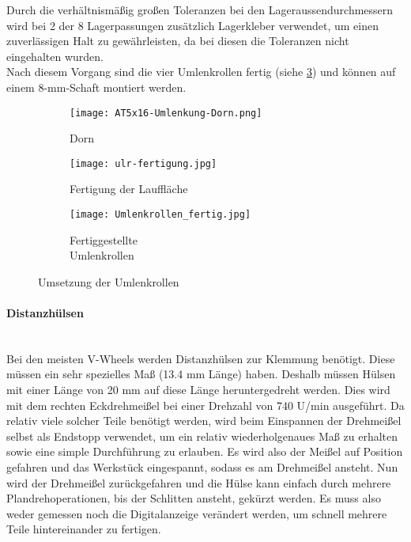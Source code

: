     Durch die verhältnismäßig großen Toleranzen bei den Lageraussendurchmessern wird bei 2 der 8 Lagerpassungen zusätzlich Lagerkleber verwendet, um einen zuverlässigen Halt zu gewährleisten, da bei diesen die Toleranzen nicht eingehalten wurden.\\
    Nach diesem Vorgang sind die vier Umlenkrollen fertig (siehe \ref{ulr:f2}) und können auf einem 8-mm-Schaft montiert werden.

    \begin{figure}[H]
        \centering
        \begin{subfigure}{.3\textwidth}
            \centering
            \texttt{[image: AT5x16-Umlenkung-Dorn.png]}
            \caption{Dorn}
            \label{ulr:dorn}
        \end{subfigure}%
        \begin{subfigure}{.3\textwidth}
            \centering
            \texttt{[image: ulr-fertigung.jpg]}
            \caption{Fertigung der Lauffläche}
            \label{ulr:f1}
        \end{subfigure}%
        \begin{subfigure}{.3\textwidth}
            \centering
            \texttt{[image: Umlenkrollen\_fertig.jpg]}
            \centering
            \caption{Fertiggestellte \\Umlenkrollen}
            \label{ulr:f2}
        \end{subfigure}
        \caption{Umsetzung der Umlenkrollen}
        \label{ulr}
    \end{figure}

\paragraph{Distanzhülsen}\mbox{}\\
Bei den meisten V-Wheels werden Distanzhülsen zur Klemmung benötigt. Diese müssen ein sehr spezielles Maß (13.4 mm Länge) haben. Deshalb müssen Hülsen mit einer Länge von 20 mm auf diese Länge heruntergedreht werden. Dies wird mit dem rechten Eckdrehmeißel bei einer Drehzahl von 740 U/min ausgeführt. Da relativ viele solcher Teile benötigt werden, wird beim Einspannen der Drehmeißel selbst als Endstopp verwendet, um ein relativ wiederholgenaues Maß zu erhalten sowie eine simple Durchführung zu erlauben. Es wird also der Meißel auf Position gefahren und das Werkstück eingespannt, sodass es am Drehmeißel ansteht. Nun wird der Drehmeißel zurückgefahren und die Hülse kann einfach durch mehrere Plandrehoperationen, bis der Schlitten ansteht, gekürzt werden. Es muss also weder gemessen noch die Digitalanzeige verändert werden, um schnell mehrere Teile hintereinander zu fertigen.

